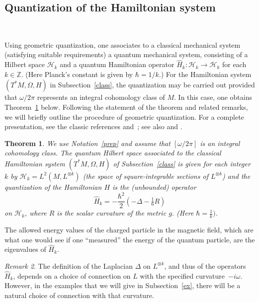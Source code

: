 \documentclass[12pt,leqno]{amsart}%
\newtheorem{theorem}{Theorem}[section]
\theoremstyle{definition}
\theoremstyle{remark}
\newtheorem{remark}[theorem]{Remark}
\numberwithin{equation}{section}
\def\Lk{{L^{\otimes k}}}
\begin{document}
\subsection{Quantization of the Hamiltonian system}\label{subsec:GQ}\

Using geometric quantization, one associates to a classical mechanical system
(satisfying suitable requirements) a quantum mechanical system, consisting of a
Hilbert space $\mathcal{H}_{k}$ and a quantum Hamiltonian operator
$\widehat{H}_{k}:\mathcal{H}_{k}\to \mathcal{H}_{k}$ for each $k\in\mathbb{Z}$.
(Here Planck's constant is given by $\hbar=1/k$.)   For the Hamiltonian system
$(T^*M, \Omega,
H)$ in Subsection~\ref{class},  the quantization may be carried out provided
that
$\omega/2\pi$ represents an integral cohomology class of $M$.   In this case,
one obtains Theorem~\ref{hk} below. Following the statement of the theorem
and related remarks, we will briefly outline the procedure of geometric
quantization. For a complete presentation, see the classic references
\cite{Woo} and~\cite{Sni}; see also \cite{GS} and \cite{BW}.

\begin{theorem}\label{hk}
\label{thm:Q(H)}\cite[p. 204]{Woo}
We use
Notation~\ref{prep} and assume that $[\omega/2\pi]$ is an integral cohomology
class. The quantum Hilbert space associated to the classical Hamiltonian
system
$(T^{\ast}M,\Omega,H)$ of Subsection~\ref{class} is given for each integer $k$
by
$\mathcal{H}_{k}=L^{2}(M,L^{\otimes k})$ (the space of square-integrable
sections of $\Lk$) and the quantization of the Hamiltonian $H$ is the
(unbounded) operator
\begin{equation}\label{Hamiltonian}
\widehat{H}_{k}=-\frac{\hbar^{2}}{2}(-\Delta-\tfrac{1}{6}R)
\end{equation}
on $\mathcal{H}_{k}$, where $R$ is the scalar curvature of the metric $g$.
(Here $\hbar=
\frac{1}{k})$.
\end{theorem}

The allowed energy values of the charged particle in the magnetic field, which
are what one would see if one
``measured'' the energy of the quantum particle, are the eigenvalues of
$\widehat{H}_{k}$.

\begin{remark}\label{amb} The definition of the Laplacian $\Delta$ on $\Lk$,
and thus of the operators $\widehat{H}_{k}$, depends on a choice of connection on
$L$
with the specified curvature~$-i\omega$.   However, in the examples that we will
give in
Subsection~\ref{ex}, there will be a natural choice of connection
with that curvature.
\end{remark}
\end{document}
